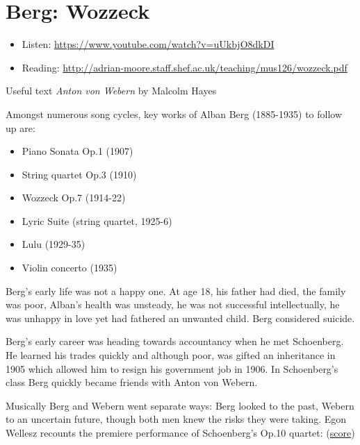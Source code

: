 \section{Berg: Wozzeck}
\begin{itemize}
\item Listen: \url{https://www.youtube.com/watch?v=uUkbjO8dkDI}
\item Reading: \url{http://adrian-moore.staff.shef.ac.uk/teaching/mus126/wozzeck.pdf}
\end{itemize}

Useful text \textit{Anton von Webern} by Malcolm Hayes \citeyearpar{hayes1995anton}

Amongst numerous song cycles, key works of Alban Berg (1885-1935) to follow up are:
\begin{itemize}
\item Piano Sonata Op.1 (1907)
\item String quartet Op.3 (1910)
\item Wozzeck Op.7 (1914-22)
\item Lyric Suite (string quartet, 1925-6)
\item Lulu (1929-35)
\item Violin concerto (1935) 
\end{itemize}

Berg's early life was not a happy one. At age 18, his father had died, the family was poor, Alban's health was unsteady, he was not successful intellectually, he was unhappy in love yet had fathered an unwanted child. Berg considered suicide. 

Berg's early career was heading towards accountancy when he met Schoenberg. He learned his trades quickly and although poor, was gifted an inheritance in 1905 which allowed him to resign his government job in 1906. In Schoenberg's class Berg quickly became friends with Anton von Webern.

Musically Berg and Webern went separate ways: Berg looked to the past, Webern to an uncertain future, though both men knew the risks they were taking. Egon Wellesz recounts the premiere performance of Schoenberg's Op.10 quartet: (\href{http://conquest.imslp.info/files/imglnks/usimg/c/c1/IMSLP29725-PMLP66179-Schoenberg_-_SQ_No._2_score.pdf}{score})

